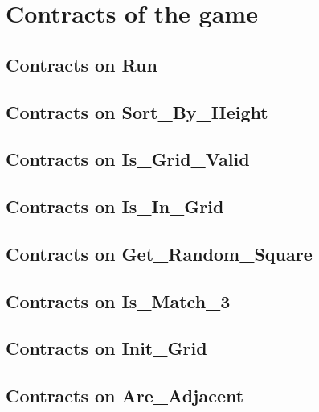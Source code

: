 \section{Contracts of the game}

\subsection{Contracts on Run}


\subsection{Contracts on Sort\_By\_Height}


\subsection{Contracts on Is\_Grid\_Valid}


\subsection{Contracts on Is\_In\_Grid}


\subsection{Contracts on Get\_Random\_Square}


\subsection{Contracts on Is\_Match\_3}


\subsection{Contracts on Init\_Grid}


\subsection{Contracts on Are\_Adjacent}


